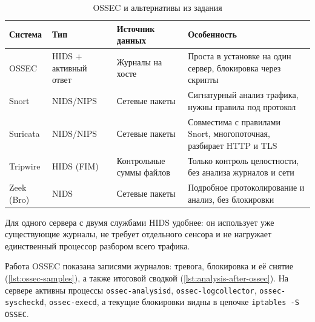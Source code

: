 \begin{table}[H]
\centering
\small
\begin{tabular}{|p{1.8cm}|p{2.9cm}|p{3.2cm}|p{4.6cm}|}
\hline
\textbf{Система} & \textbf{Тип} & \textbf{Источник данных} & \textbf{Особенность} \\
\hline
OSSEC & HIDS + активный ответ & Журналы на хосте & Проста в установке на один сервер, блокировка через скрипты \\
\hline
Snort & NIDS/NIPS & Сетевые пакеты & Сигнатурный анализ трафика, нужны правила под протокол \\
\hline
Suricata & NIDS/NIPS & Сетевые пакеты & Совместима с правилами Snort, многопоточная, разбирает HTTP и TLS \\
\hline
Tripwire & HIDS (FIM) & Контрольные суммы файлов & Только контроль целостности, без анализа журналов и сети \\
\hline
Zeek (Bro) & NIDS & Сетевые пакеты & Подробное протоколирование и анализ, без блокировки \\
\hline
\end{tabular}
\caption{OSSEC и альтернативы из задания}
\end{table}

Для одного сервера с двумя службами HIDS удобнее: он использует уже
существующие журналы, не требует отдельного сенсора и не нагружает
единственный процессор разбором всего трафика.


Работа OSSEC показана записями журналов: тревога, блокировка и её снятие
(\autoref{lst:ossec-samples}), а также итоговой сводкой
(\autoref{lst:analysis-after-ossec}). На сервере активны процессы
\texttt{ossec-analysisd}, \texttt{ossec-logcollector},
\texttt{ossec-syscheckd}, \texttt{ossec-execd}, а текущие блокировки
видны в цепочке \texttt{iptables -S OSSEC}.
